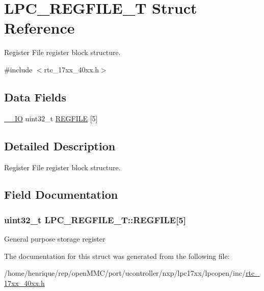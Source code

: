 \hypertarget{structLPC__REGFILE__T}{\section{L\-P\-C\-\_\-\-R\-E\-G\-F\-I\-L\-E\-\_\-\-T Struct Reference}
\label{structLPC__REGFILE__T}
}


Register File register block structure.  




{\ttfamily \#include $<$rtc\-\_\-17xx\-\_\-40xx.\-h$>$}

\subsection*{Data Fields}
\begin{DoxyCompactItemize}
\item 
\hyperlink{core__cm3_8h_aec43007d9998a0a0e01faede4133d6be}{\-\_\-\-\_\-\-I\-O} uint32\-\_\-t \hyperlink{structLPC__REGFILE__T_ae61f3de82503d032642cbdd27a4a160d}{R\-E\-G\-F\-I\-L\-E} \mbox{[}5\mbox{]}
\end{DoxyCompactItemize}


\subsection{Detailed Description}
Register File register block structure. 

\subsection{Field Documentation}
\hypertarget{structLPC__REGFILE__T_ae61f3de82503d032642cbdd27a4a160d}{
\subsubsection[{R\-E\-G\-F\-I\-L\-E}]{ uint32\-\_\-t L\-P\-C\-\_\-\-R\-E\-G\-F\-I\-L\-E\-\_\-\-T\-::\-R\-E\-G\-F\-I\-L\-E\mbox{[}5\mbox{]}}}\label{structLPC__REGFILE__T_ae61f3de82503d032642cbdd27a4a160d}
General purpose storage register 

The documentation for this struct was generated from the following file\-:\begin{DoxyCompactItemize}
\item 
/home/henrique/rep/open\-M\-M\-C/port/ucontroller/nxp/lpc17xx/lpcopen/inc/\hyperlink{rtc__17xx__40xx_8h}{rtc\-\_\-17xx\-\_\-40xx.\-h}\end{DoxyCompactItemize}
